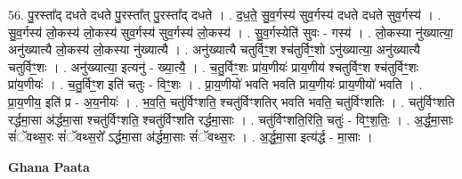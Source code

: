 \documentclass[17pt]{extarticle}
\begin{document}
56. पु॒रस्ता᳚द् दधते दधते पु॒रस्ता᳚त् पु॒रस्ता᳚द् दधते । . द॒ध॒ते॒ सु॒व॒र्गस्य॑ सुव॒र्गस्य॑ दधते दधते सुव॒र्गस्य॑ । . सु॒व॒र्गस्य॑ लो॒कस्य॑ लो॒कस्य॑ सुव॒र्गस्य॑ सुव॒र्गस्य॑ लो॒कस्य॑ । . सु॒व॒र्गस्येति॑ सुवः - गस्य॑ । . लो॒कस्या नु॑ख्यात्या॒ अनु॑ख्यात्यै लो॒कस्य॑ लो॒कस्या नु॑ख्यात्यै । . अनु॑ख्यात्यै चतुर्विꣳ॒॒श श्च॑तुर्विꣳ॒॒शो ऽनु॑ख्यात्या॒ अनु॑ख्यात्यै चतुर्विꣳ॒॒शः । . अनु॑ख्यात्या॒ इत्यनु॑ - ख्या॒त्यै॒ । . च॒तु॒र्विꣳ॒॒शः प्रा॑य॒णीयः॑ प्राय॒णीय॑ श्चतुर्विꣳ॒॒श श्च॑तुर्विꣳ॒॒शः प्रा॑य॒णीयः॑ । . च॒तु॒र्विꣳ॒॒श इति॑ चतुः - विꣳ॒॒शः । . प्रा॒य॒णीयो॑ भवति भवति प्राय॒णीयः॑ प्राय॒णीयो॑ भवति । . प्रा॒य॒णीय॒ इति॑ प्र - अ॒य॒नीयः॑ । . भ॒व॒ति॒ चतु॑र्विꣳशति॒ श्चतु॑र्विꣳशतिर् भवति भवति॒ चतु॑र्विꣳशतिः । . चतु॑र्विꣳशति रर्द्धमा॒सा अ॑र्द्धमा॒सा श्चतु॑र्विꣳशति॒ श्चतु॑र्विꣳशति रर्द्धमा॒साः । . चतु॑र्विꣳशति॒रिति॒ चतुः॑ - विꣳ॒॒श॒तिः॒ । . अ॒र्द्ध॒मा॒साः सं॑ॅवथ्स॒रः सं॑ॅवथ्स॒रो᳚ ऽर्द्धमा॒सा अ॑र्द्धमा॒साः सं॑ॅवथ्स॒रः । . अ॒र्द्ध॒मा॒सा इत्य॑र्द्ध - मा॒साः । \newline

\textbf{Ghana Paata } \newline
\end{document}
